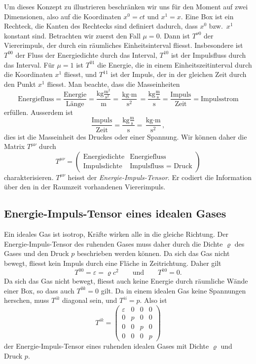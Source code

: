 Um dieses Konzept zu illustrieren beschränken wir uns für den Moment
auf zwei Dimensionen, also auf die Koordinaten $x^0=ct$ und $x^1=x$.
Eine Box ist ein Rechteck, die Kanten des Rechtecks sind definiert
dadurch, dass $x^0$ bzw.~$x^1$ konstant sind.
Betrachten wir zuerst den Fall $\mu=0$.
Dann ist $T^{\nu0}$ der Viererimpuls, der durch ein räumliches
Einheitsinterval fliesst.
Insbesondere ist $T^{00}$ der Fluss der Energiedichte durch das Interval,
$T^{10}$ ist der Impulsfluss durch das Interval.
Für $\mu=1$ ist $T^{01}$ die Energie, die in einem Einheitszeitinterval
durch die Koordinaten $x^1$ fliesst, und $T^{11}$ ist der Impuls, der in der
gleichen Zeit durch den Punkt $x^1$ fliesst.
Man beachte, dass die Masseinheiten
\[
\text{Energiefluss}
=
\frac{\text{Energie}}{\text{Länge}}
=
\frac{\text{kg}\frac{\text{m}^2}{\text{s}^2}}{\text{m}}
=
\frac{\text{kg}\cdot\text{m}}{\text{s}^2}
=
\frac{\text{kg}\frac{\text{m}}{\text{s}}}{\text{s}}
=
\frac{\text{Impuls}}{\text{Zeit}}
=
\text{Impulsstrom}
\]
erfüllen.
Ausserdem ist 
\[
\frac{\text{Impuls}}{\text{Zeit}}
=
\frac{\text{kg}\frac{\text{m}}{\text{s}}}{\text{s}}
=
\frac{\text{kg}\cdot\text{m}}{\text{s}^2},
\]
dies ist die Masseinheit des Druckes oder einer Spannung.
Wir können daher die Matrix $T^{\mu\nu}$
durch
\[
T^{\mu\nu}
=
\begin{pmatrix}
\text{Energiedichte}
&\text{Energiefluss}
\\
\text{Impulsdichte}
&\text{Impulsfluss = Druck}
\end{pmatrix}
\]
charakterisieren.
$T^{\mu\nu}$ heisst der {\em Energie-Impuls-Tensor}.
Er codiert die Information über den in der Raumzeit vorhandenen
Viererimpuls.

%

\subsection{Energie-Impuls-Tensor eines idealen Gases%
\label{skript:speziell:subsection:idealesgas}}
Ein ideales Gas ist isotrop, Kräfte wirken alle in die gleiche
Richtung.
Der Energie-Impuls-Tensor des ruhenden Gases muss daher durch die
Dichte $\varrho$ des Gases und den Druck $p$ beschrieben werden können.
Da sich das Gas nicht bewegt, fliesst kein Impuls durch eine Fläche
in Zeitrichtung.
Daher gilt
\[
T^{00}
=
\varepsilon
=
\varrho c^2
\qquad
\text{und}
\qquad
T^{k0}
=
0.
\]
Da sich das Gas nicht bewegt, fliesst auch keine Energie durch räumliche
Wände einer Box, so dass auch $T^{0k}=0$ gilt.
Da in einem idealen Gas keine Spannungen herschen, muss $T^{ik}$ diagonal
sein, und $T^{ii}=p$.
Also ist
\[
T^{ik}
=
\begin{pmatrix}
\varepsilon&0&0&0\\
0&p&0&0\\
0&0&p&0\\
0&0&0&p
\end{pmatrix}
\]
der Energie-Impuls-Tensor eines ruhenden idealen Gases mit Dichte
$\varrho$ und Druck $p$.
%

